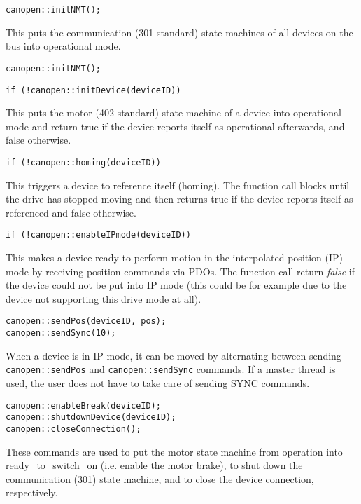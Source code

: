 \begin{verbatim}
canopen::initNMT();
\end{verbatim}
This puts the communication (301 standard) state machines of all devices on the bus into operational mode.

\begin{verbatim}
canopen::initNMT();
\end{verbatim}

\begin{verbatim}
if (!canopen::initDevice(deviceID))
\end{verbatim}
This puts the motor (402 standard) state machine of a device into operational mode and return true if the device reports itself as operational afterwards, and false otherwise.

\begin{verbatim}
if (!canopen::homing(deviceID))
\end{verbatim}
This triggers a device to reference itself (homing). The function call blocks until the drive has stopped moving and then returns true if the device reports itself as referenced and false otherwise.

\begin{verbatim}
if (!canopen::enableIPmode(deviceID))
\end{verbatim}
This makes a device ready to perform motion in the interpolated-position (IP) mode by receiving position commands via PDOs. The function call return {\em false} if the device could not be put into IP mode (this could be for example due to the device not supporting this drive mode at all).

\begin{verbatim}
canopen::sendPos(deviceID, pos);
canopen::sendSync(10);
\end{verbatim}
When a device is in IP mode, it can be moved by alternating between sending \texttt{canopen::sendPos} and \texttt{canopen::sendSync} commands. If a master thread is used, the user does not have to take care of sending SYNC commands.

\begin{verbatim}
canopen::enableBreak(deviceID);
canopen::shutdownDevice(deviceID);
canopen::closeConnection(); 
\end{verbatim}
These commands are used to put the motor state machine from operation into ready\_to\_switch\_on (i.e. enable the motor brake), to shut down the communication (301) state machine, and to close the device connection, respectively.

